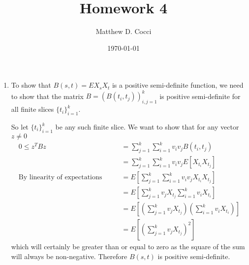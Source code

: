 \documentclass[12pt]{article}
\author{Matthew D. Cocci}
\title{Homework 4}
\date{\today}
\theoremstyle{plain}
\theoremstyle{definition}
\theoremstyle{remark}
\begin{document}
\maketitle


\begin{enumerate}
  \item %
    To show that $B(s,t)=EX_sX_t$ is a positive semi-definite function,
    we need to show that the matrix $B =
    \left(B(t_i,t_j)\right)_{i,j=1}^k$ is positive semi-definite for all
    finite slices $\{t_i\}_{i=1}^k$.

    So let $\{t_i\}_{i=1}^k$ be any such finite slice. We want to show
    that for any vector $z\neq 0$
    \begin{align*}
      0 \leq z^T B z
      &= \sum^k_{j=1} \sum^k_{i=1} v_i v_j B(t_i,t_j)\\
      &= \sum^k_{j=1} \sum^k_{i=1} v_i v_j E[X_{t_i}X_{t_j}]\\
      \text{By linearity of expectations} \qquad
      &= E\left[\sum^k_{j=1} \sum^k_{i=1} v_i v_j X_{t_i}X_{t_j}\right]\\
      &= E\left[\sum^k_{j=1} v_j X_{t_j} \sum^k_{i=1} v_i
          X_{t_i}\right]\\
      &= E\left[\left(\sum^k_{j=1} v_j X_{t_j}\right)
          \left( \sum^k_{i=1} v_i X_{t_i}\right)\right]\\
      &= E\left[\left(\sum^k_{j=1} v_j X_{t_j}\right)^2 \right]
    \end{align*}
    which will certainly be greater than or equal to zero as the square
    of the sum will always be non-negative. Therefore $B(s,t)$ is
    positive semi-definite.


\end{enumerate}
\end{document}
